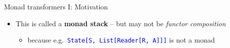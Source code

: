 \documentclass[english]{beamer}
\begin{document}
\begin{frame}{Monad transformers I: Motivation}
\begin{itemize}
\begin{itemize}
\item Example in Scala: \texttt{\textcolor{blue}{\footnotesize{}StateT{[}S,
ListT{[}Reader{[}R, ?{]}, ?{]}, A{]}}} 
\item Substitute nested transformers into the monad argument, not as $A$
\end{itemize}
\item This is called a \textbf{monad stack} -- but may not be \emph{functor
composition}
\begin{itemize}
\item because e.g.~\texttt{\textcolor{blue}{\footnotesize{}State{[}S, List{[}Reader{[}R,
A{]}{]}{]}}} is not a monad
\end{itemize}
\end{itemize}
\end{frame}
\end{document}
